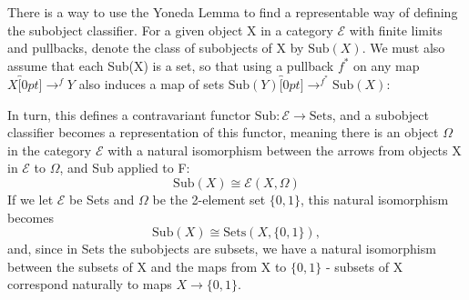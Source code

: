 \documentclass{article}
\begin{document}
There is a way to use the Yoneda Lemma to find a representable way of defining the subobject classifier. For a given object X in a category \(\mathcal{E}\) with finite limits and pullbacks, denote the class of subobjects of X by \(\mathrm{Sub}(X)\). We must also assume that each Sub(X) is a set, so that using a pullback \(f^{*}\) on any map \(X\overbracket[0pt]{\rightarrow}^{f}Y\) also induces a map of sets \(\mathrm{Sub}(Y)\overbracket[0pt]{\rightarrow}^{f^{*}}\mathrm{Sub}(X)\):
\begin{center}
\end{center}

In turn, this defines a contravariant functor \(\mathrm{Sub}:\mathcal{E}\rightarrow \mathrm{Sets}\), and a subobject classifier becomes a representation of this functor, meaning there is an object \(\Omega \) in the category \(\mathcal{E}\) with a natural isomorphism between the arrows from objects X in \(\mathcal{E}\) to \(\Omega \), and Sub applied to F:
\[
	\mathrm{Sub}(X)\cong \mathcal{E}(X, \Omega )
\]
If we let \(\mathcal{E}\) be Sets and \(\Omega\) be the 2-element set \(\{0,1\}\), this natural isomorphism becomes
\[
	\mathrm{Sub}(X)\cong \mathrm{Sets}(X, \{0, 1\}),
\]
and, since in Sets the subobjects are subsets, we have a natural isomorphism between the subsets of X and the maps from X to \(\{0, 1\}\) - subsets of X correspond naturally to maps \(X\rightarrow \{0,1\}.\)
\end{document}
